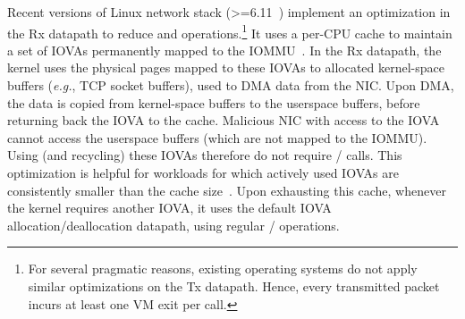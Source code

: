 Recent versions of Linux network stack (>=6.11~\cite{linux_page_pool_netmem}) implement
    an optimization in the Rx datapath to reduce 
    and  operations.{\footnote{For several pragmatic reasons, existing operating systems do not apply similar optimizations on the Tx datapath.
%
Hence, every transmitted packet incurs at least one VM exit per  call.}}
It uses a per-CPU cache to maintain a set of IOVAs permanently mapped to the IOMMU~\cite{markuze2018damn}. 
In the Rx datapath, the kernel uses the physical pages mapped to these IOVAs to allocated kernel-space buffers 
    (\textit{e.g.}, TCP socket buffers), used to DMA data from the NIC. 
Upon DMA, the data is copied from kernel-space buffers to the userspace buffers, 
    before returning back the IOVA to the cache.
Malicious NIC with access to the IOVA cannot access the userspace buffers (which are not mapped to the IOMMU). 
Using (and recycling) these IOVAs therefore do not require / calls. 
This optimization is helpful for workloads for which actively used IOVAs are consistently smaller than the cache size~\cite{Rubin2024FastSafe}. 
Upon exhausting this cache, whenever the kernel requires another IOVA, 
it uses the default IOVA allocation/deallocation datapath, 
using regular / operations.



